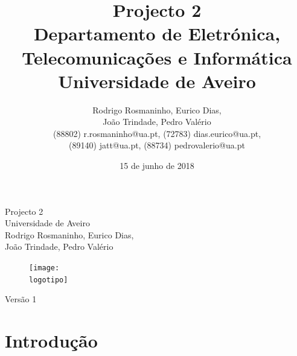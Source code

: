 \documentclass{report}
\begin{document}
%
\def\titulo{Projecto 2}
\def\data{15 de junho de 2018}
\def\autores{Rodrigo Rosmaninho, Eurico Dias,\\ João Trindade, Pedro Valério}
\def\autorescontactos{(88802) r.rosmaninho@ua.pt, (72783) dias.eurico@ua.pt,\\ (89140) jatt@ua.pt, (88734) pedrovalerio@ua.pt}
\def\versao{Versão 1}
\def\departamento{Departamento de Eletrónica, Telecomunicações e Informática}
\def\empresa{Universidade de Aveiro}
\def\logotipo{ua.pdf}
%
%
\begin{titlepage}

	\begin{center}
		\vspace*{50mm}
		{\Huge \titulo}\\
		\vspace{10mm}
		{\Large \empresa}\\
		\vspace{10mm}
		{\LARGE \autores}\\
		\vspace{30mm}
		\begin{figure}[h]
			\center
			\texttt{[image: \\logotipo]}
		\end{figure}
		\vspace{30mm}
	\end{center}
	\begin{flushright}
		\versao
	\end{flushright}
\end{titlepage}

\title{%
{\Huge\textbf{\titulo}}\\
{\Large \departamento\\ \empresa}
}
%
\author{%
	\autores \\
	\autorescontactos
}
%
\date{\data}
%
\maketitle


\tableofcontents
\listoffigures


\clearpage
{}

\chapter{Introdução}
\label{chap.introducao}
\end{document}
